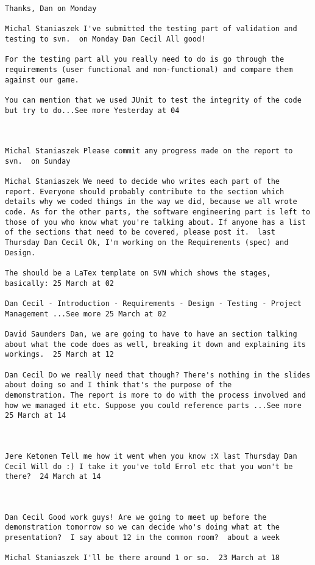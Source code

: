 \documentclass[10pt]{report}
\begin{document}
\begin{verbatim}
Thanks, Dan on Monday

Michal Staniaszek I've submitted the testing part of validation and
testing to svn.  on Monday Dan Cecil All good!

For the testing part all you really need to do is go through the
requirements (user functional and non-functional) and compare them
against our game.

You can mention that we used JUnit to test the integrity of the code
but try to do...See more Yesterday at 04



Michal Staniaszek Please commit any progress made on the report to
svn.  on Sunday

Michal Staniaszek We need to decide who writes each part of the
report. Everyone should probably contribute to the section which
details why we coded things in the way we did, because we all wrote
code. As for the other parts, the software engineering part is left to
those of you who know what you're talking about. If anyone has a list
of the sections that need to be covered, please post it.  last
Thursday Dan Cecil Ok, I'm working on the Requirements (spec) and
Design.

The should be a LaTex template on SVN which shows the stages,
basically: 25 March at 02

Dan Cecil ‎- Introduction - Requirements - Design - Testing - Project
Management ...See more 25 March at 02

David Saunders Dan, we are going to have to have an section talking
about what the code does as well, breaking it down and explaining its
workings.  25 March at 12

Dan Cecil Do we really need that though? There's nothing in the slides
about doing so and I think that's the purpose of the
demonstration. The report is more to do with the process involved and
how we managed it etc. Suppose you could reference parts ...See more
25 March at 14



Jere Ketonen Tell me how it went when you know :X last Thursday Dan
Cecil Will do :) I take it you've told Errol etc that you won't be
there?  24 March at 14



Dan Cecil Good work guys! Are we going to meet up before the
demonstration tomorrow so we can decide who's doing what at the
presentation?  I say about 12 in the common room?  about a week 

Michal Staniaszek I'll be there around 1 or so.  23 March at 18


\end{verbatim}
\end{document}
